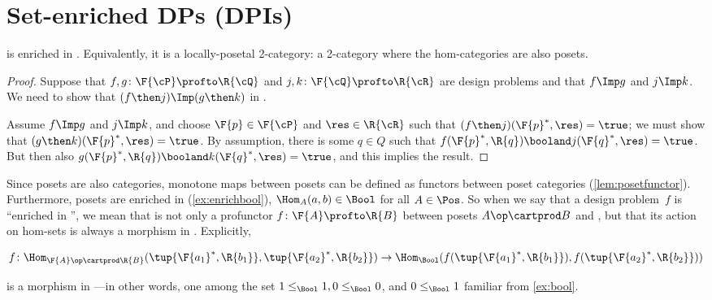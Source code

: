 
\section{Set-enriched DPs (DPIs)}

\begin{proposition}
    \label{prop:DP_loc_pos}
    \DP is enriched in \Pos.
    Equivalently, it is a locally-posetal 2-category: a 2-category where the hom-categories are also posets.
\end{proposition}
\begin{proof}
    Suppose that $f,g\colon \F{\cP} \profto \R{\cQ}$ and $j,k\colon \F{\cQ} \profto \R{\cR}$ are design problems and that $f\Imp g$ and $j\Imp k$.
    We need to show that $(f\then j)\Imp(g\then k)$ in \DP.
    \begin{center}
    \end{center}
    Assume $f\Imp g$ and $j\Imp k$, and choose $\F{p}\in\F{\cP} $ and $\res\in\R{\cR}$ such that $(f\then j)(\F{p}^*,\res)=\true$; we must show that $(g \then k)(\F{p}^*,\res)=\true$.
    By assumption, there is some $q\in Q$ such that $f(\F{p}^*,\R{q})\booland j(\F{q}^*,\res)=\true$.
    But then also $g(\F{p}^*,\R{q})\booland k(\F{q}^*,\res)=\true$, and this implies the result.
\end{proof}
Since posets are also categories, monotone maps between posets can be defined as functors between poset categories (\cref{lem:posetfunctor}).
Furthermore, posets are enriched in \Bool (\cref{ex:enrichbool}), \ie $\Hom_A(a,b) \in \Bool$ for all $A \in \Pos$.
So when we say that a design problem~$f$ is ``enriched in \Bool'', we mean that is not only a profunctor $f \colon \F{A} \profto \R{B}$ between posets $A\op \cartprod B$ and \Bool, but that its action on hom-sets is always a morphism in \Bool.
Explicitly,

\begin{widepar}
    \begin{equation*}
        f \colon \Hom_{\F{A}\op \cartprod \R{B}}(\tup{\F{a_1}^*,\R{b_1}}, \tup{\F{a_2}^*,\R{b_2}}) \to \Hom_\Bool(f(\tup{\F{a_1}^*,\R{b_1}}), f(\tup{\F{a_2}^*,\R{b_2}}))
    \end{equation*}
\end{widepar}
is a morphism in \Bool---in other words, one among the set $1 \leq_\Bool 1, 0 \leq_\Bool 0$, and $0 \leq_\Bool 1$ familiar from \cref{ex:bool}.

